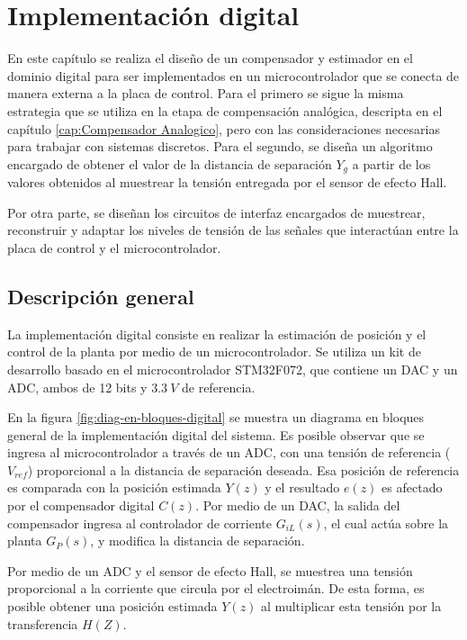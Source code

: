 \chapter{Implementación digital}  \label{cap:Implementacion digital}

En este capítulo se realiza el diseño de un compensador y estimador en el dominio digital para ser implementados en un microcontrolador que se conecta de manera externa a la placa de control. Para el primero se sigue la misma estrategia que se utiliza en la etapa de compensación analógica, descripta en el capítulo \ref{cap:Compensador Analogico}, pero con las consideraciones necesarias para trabajar con sistemas discretos. Para el segundo, se diseña un algoritmo encargado de obtener el valor de la distancia de separación $Y_g$ a partir de los valores obtenidos al muestrear la tensión entregada por el sensor de efecto Hall.

Por otra parte, se diseñan los circuitos de interfaz encargados de muestrear, reconstruir y adaptar los niveles de tensión de las señales que interactúan entre la placa de control y el microcontrolador.


\section{Descripción general}

\noindent La implementación digital consiste en realizar la estimación de posición y el control de la planta por medio de un microcontrolador. Se utiliza un kit de desarrollo basado en el microcontrolador STM32F072, que contiene un DAC y un ADC, ambos de 12 bits y $3.3\:V$ de referencia. 

\noindent En la figura \ref{fig:diag-en-bloques-digital} se muestra un diagrama en bloques general de la implementación digital del sistema. Es posible observar que se ingresa al microcontrolador a través de un ADC, con una tensión de referencia ($V_{ref}$) proporcional a la distancia de separación deseada. Esa posición de referencia es comparada con la posición estimada $Y(z)$ y el resultado $e(z)$ es afectado por el compensador digital $C(z)$. Por medio de un DAC, la salida del compensador ingresa al controlador de corriente $G_{iL}(s)$, el cual actúa sobre la planta $G_P(s)$, y modifica la distancia de separación.

\noindent Por medio de un ADC y el sensor de efecto Hall, se muestrea una tensión proporcional a la corriente que circula por el electroimán. De esta forma, es posible obtener una posición estimada $Y(z)$ al multiplicar esta tensión por la transferencia $H(Z)$.


